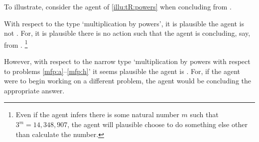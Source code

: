 \begin{note}
  To illustrate, consider the agent of \autoref{illu:tR:powers} when concluding  from .

  With respect to the type `multiplication by powers', it is plausible the agent is not \ptCV{}.
  For, it is plausible there is no action such that the agent is concluding, say,  from .%
  \footnote{
    Even if the agent infers there is some natural number \(m\) such that \(3^{m} = 14,348,907\), the agent will plausible choose to do something else other than calculate the number.
  }

  However, with respect to the narrow type `multiplication by powers with respect to problems \ref{mfp:a}--\ref{mfp:h}' it seems plausible the agent is \ptCV{}.
  For, if the agent were to begin working on a different problem, the agent would be concluding the appropriate answer.
\end{note}





